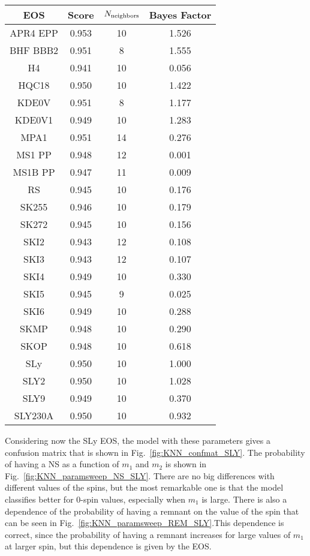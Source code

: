 \begin{table}
    \centering
\begin{tabular}{cccc}
\hline
    EOS & Score & $N_{\rm neighbors}$ & Bayes Factor\\
    \hline 
    \hline
    APR4 EPP & 0.953 & 10 &  1.526 \\
    BHF BBB2 & 0.951 & 8  &  1.555 \\
    H4       & 0.941 & 10 &  0.056 \\
    HQC18    & 0.950 & 10 &  1.422 \\
    KDE0V    & 0.951 & 8  &  1.177 \\
    KDE0V1   & 0.949 & 10 &  1.283 \\
    MPA1     & 0.951 & 14 &  0.276 \\
    MS1 PP   & 0.948 & 12 &  0.001 \\
    MS1B PP  & 0.947 & 11 &  0.009 \\
    RS       & 0.945 & 10 &  0.176 \\
    SK255    & 0.946 & 10 &  0.179 \\
    SK272    & 0.945 & 10 &  0.156 \\
    SKI2     & 0.943 & 12 &  0.108 \\ 
    SKI3     & 0.943 & 12 &  0.107 \\
    SKI4     & 0.949 & 10 &  0.330 \\
    SKI5     & 0.945 & 9  &  0.025 \\
    SKI6     & 0.949 & 10 &  0.288 \\
    SKMP     & 0.948 & 10 &  0.290 \\
    SKOP     & 0.948 & 10 &  0.618 \\
    SLy      & 0.950 & 10 &  1.000 \\
    SLY2     & 0.950 & 10 &  1.028 \\
    SLY9     & 0.949 & 10 &  0.370 \\
    SLY230A  & 0.950 & 10 &  0.932 \\
    
\hline
\end{tabular}
    \caption{}
    \label{tab:KNN_CV}
\end{table}


Considering now the SLy EOS,  the model with these parameters gives a confusion matrix that is shown in Fig.~\ref{fig:KNN_confmat_SLY}.  The probability of having a NS as a function of $m_1$ and $m_2$  is shown in Fig.~\ref{fig:KNN_paramsweep_NS_SLY}. There are no big differences with different values of the spins, but the most remarkable one is that the model classifies better for 0-spin values, especially when $m_1$ is large.  There is also a dependence of the probability of having a remnant on the value of the spin that can be seen in Fig.~\ref{fig:KNN_paramsweep_REM_SLY}.This dependence is correct, since the probability of having a remnant increases for large values of $m_1$ at larger spin, but this dependence is given by the EOS. 

